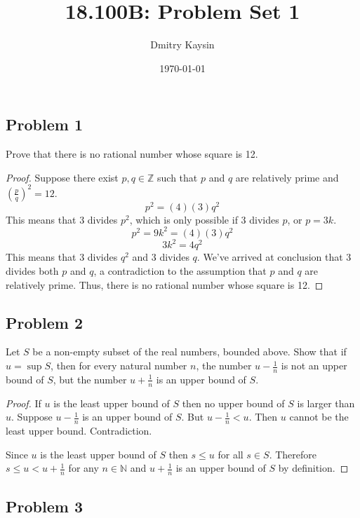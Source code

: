 \documentclass{article}
\title{18.100B: Problem Set 1}
\author{Dmitry Kaysin}
\date\today
\begin{document}
\maketitle 

\subsection*{Problem 1}

\begin{tcolorbox}
Prove that there is no rational number whose square is 12.
\end{tcolorbox}

\begin{proof}
Suppose there exist $p,q \in \mathbb{Z}$ such that $p$ and $q$ are relatively prime and $(\frac{p}{q})^2=12$.
$$p^2 = (4)(3)q^2$$
This means that 3 divides $p^2$, which is only possible if 3 divides $p$, or $p = 3k$.
$$p^2 = 9k^2 = (4)(3)q^2$$
$$3k^2=4q^2$$
This means that 3 divides $q^2$ and 3 divides $q$.
We've arrived at conclusion that 3 divides both $p$ and $q$, a contradiction to the assumption that $p$ and $q$ are relatively prime. Thus, there is no rational number whose square is 12.
\end{proof}

\subsection*{Problem 2}
\begin{tcolorbox}
Let $S$ be a non-empty subset of the real numbers, bounded above. Show that if $u = \sup S$, then for every natural number $n$, the number $u - \frac{1}{n}$ is not an upper bound of $S$,
but the number $u + \frac{1}{n}$ is an upper bound of $S$.
\end{tcolorbox}

\begin{proof}
If $u$ is the least upper bound of $S$ then no upper bound of $S$ is larger than $u$. Suppose $u-\frac{1}{n}$ is an upper bound of $S$. But $u-\frac{1}{n} < u$. Then $u$ cannot be the least upper bound. Contradiction.

Since $u$ is the least upper bound of $S$ then $s \leq u$ for all $s \in S$. Therefore $s \leq u < u+\frac{1}{n}$ for any $n \in \mathbb{N}$ and $u+\frac{1}{n}$ is an upper bound of $S$ by definition.
\end{proof}

\subsection*{Problem 3}
\end{document}
